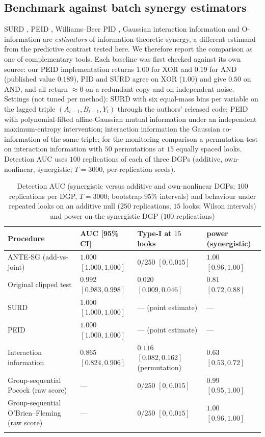 \documentclass[pdflatex,sn-mathphys-ay]{sn-jnl}%
\theoremstyle{thmstyleone}%
\theoremstyle{thmstyletwo}%
\theoremstyle{thmstylethree}%
\begin{document}
\subsection{Benchmark against batch synergy estimators}\label{subsec:exp-benchmark}

SURD \citep{surd2024}, PEID \citep{peid2026}, Williams--Beer PID \citep{williams2010}, Gaussian interaction information \citep{mcgill1954} and
O-information \citep{rosas2019} are \emph{estimators} of information-theoretic synergy, a different estimand from the predictive contrast tested here. We therefore report the comparison as one of
complementary tools. Each baseline was first checked against its own source: our PEID implementation returns $1.00$ for XOR and $0.19$ for AND (published value $0.189$), PID and SURD agree on XOR ($1.00$) and
give $0.50$ on AND, and all return $\approx0$ on a redundant copy and on independent noise. Settings (not tuned per method): SURD with six equal-mass bins per variable on the lagged triple $(A_{t-1},B_{t-1},Y_t)$ through
the authors' released code; PEID with polynomial-lifted affine-Gaussian mutual information under an independent maximum-entropy intervention; interaction information the Gaussian co-information of the same triple; for the monitoring comparison a permutation test
on interaction information with $50$ permutations at $15$ equally spaced looks. Detection AUC uses $100$ replications of each of three DGPs (additive, own-nonlinear, synergistic; $T=3000$, per-replication seeds).

\begin{table}[h]
\caption{Detection AUC (synergistic versus additive and own-nonlinear DGPs; $100$ replications per DGP, $T=3000$; bootstrap $95\%$ intervals) and behaviour under repeated looks on an additive null
($250$ replications, $15$ looks; Wilson intervals) and power on the synergistic DGP ($100$ replications)}\label{tab:bench}
\footnotesize
\begin{tabular*}{\textwidth}{@{\extracolsep\fill}p{3.7cm}p{2.5cm}p{3.0cm}p{2.1cm}}
\toprule
Procedure & AUC [95\% CI] & Type-I at $15$ looks & power (synergistic) \\
\midrule
ANTE-SG (add-vs-joint) & $1.000$ $[1.000,1.000]$ & $0/250$ $[0,0.015]$ & $1.00$ $[0.96,1.00]$ \\
Original clipped test & $0.992$ $[0.983,0.998]$ & $0.020$ $[0.009,0.046]$ & $0.81$ $[0.72,0.88]$ \\
SURD & $1.000$ $[1.000,1.000]$ & --- (point estimate) & --- \\
PEID & $1.000$ $[1.000,1.000]$ & --- (point estimate) & --- \\
Interaction information & $0.865$ $[0.824,0.906]$ & $0.116$ $[0.082,0.162]$ (permutation) & $0.63$ $[0.53,0.72]$ \\
Group-sequential Pocock (raw score) & --- & $0/250$ $[0,0.015]$ & $0.99$ $[0.95,1.00]$ \\
Group-sequential O'Brien--Fleming (raw score) & --- & $0/250$ $[0,0.015]$ & $1.00$ $[0.96,1.00]$ \\
\botrule
\end{tabular*}
\end{table}
\end{document}
